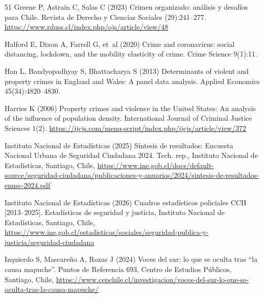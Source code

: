 \documentclass[pdflatex,sn-basic]{sn-jnl}
\begin{document}
\begin{thebibliography}{51}
Greene P, Astra\'in C, Salas C (2023) Crimen organizado: an\'alisis y
  desaf\'ios para {Chile}. Revista de Derecho y Ciencias Sociales
  (29):241--277.
  \urlprefix\url{https://www.rduss.cl/index.php/ojs/article/view/48}

Halford E, Dixon A, Farrell G, et~al (2020) Crime and coronavirus: social
  distancing, lockdown, and the mobility elasticity of crime. Crime Science
  9(1):11. 

Han L, Bandyopadhyay S, Bhattacharya S (2013) Determinants of violent and
  property crimes in {England} and {Wales}: {A} panel data analysis. Applied
  Economics 45(34):4820--4830. 

Harries K (2006) Property crimes and violence in the {United States}: {A}n
  analysis of the influence of population density. International Journal of
  Criminal Justice Sciences 1(2).
  \urlprefix\url{https://ijcjs.com/menu-script/index.php/ijcjs/article/view/372}

{Instituto Nacional de Estad\'isticas} (2025) S\'intesis de resultados:
  {E}ncuesta {N}acional {U}rbana de {S}eguridad {C}iudadana 2024. Tech. rep.,
  Instituto Nacional de Estad\'isticas, Santiago, Chile,
  \urlprefix\url{https://www.ine.gob.cl/docs/default-source/seguridad-ciudadana/publicaciones-y-anuarios/2024/sintesis-de-resultados-enusc-2024.pdf}

{Instituto Nacional de Estad\'isticas} (2026) Cuadros estad\'isticos policiales
  {CCH} [2013--2025]. Estad\'isticas de seguridad y justicia, Instituto
  Nacional de Estad\'isticas, Santiago, Chile,
  \urlprefix\url{https://www.ine.gob.cl/estadisticas/sociales/seguridad-publica-y-justicia/seguridad-ciudadana}

Izquierdo S, Mascare\~no A, Rozas J (2024) Voces del sur: lo que se oculta tras
  {``la causa mapuche''}. Puntos de Referencia 693, Centro de Estudios
  P\'ublicos, Santiago, Chile,
  \urlprefix\url{https://www.cepchile.cl/investigacion/voces-del-sur-lo-que-se-oculta-tras-la-causa-mapuche/}


\end{thebibliography}
\end{document}
